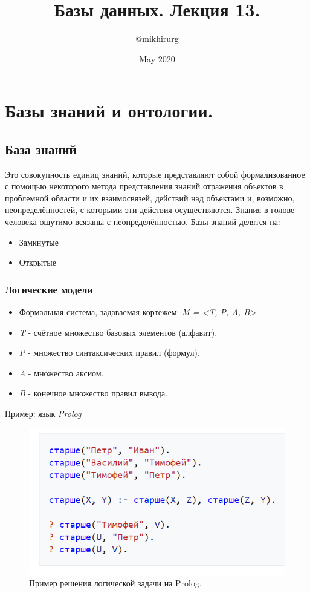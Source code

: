 \documentclass{article}
\title{Базы данных. Лекция 13.}
\author{@mikhirurg }
\date{May 2020}
\begin{document}
\maketitle

\section{Базы знаний и онтологии.}

\subsection{База знаний}
Это совокупность единиц знаний, которые представляют собой формализованное с помощью некоторого метода представления знаний отражения объектов в проблемной области и их взаимосвязей, действий над объектами и, возможно, неопределённостей, с которыми эти действия осуществяются. 
\newline Знания в голове человека ощутимо всязаны с неопределённостью. 
\newline
\newline Базы знаний делятся на:
\begin{itemize}
    \item Замкнутые
    \item Открытые
\end{itemize}

\subsubsection{Логические модели}
\begin{itemize}
    \item Формальная система, задаваемая кортежем: \textit{M = <T, P, A, B>}
    \item \textit{T} - счётное множество базовых элементов (алфавит).
    \item \textit{P} - множество синтаксических правил (формул).
    \item \textit{A} - множество аксиом.
    \item \textit{B} - конечное множество правил вывода.
\end{itemize}
Пример: язык \textit{Prolog}
\begin{figure}[H]
    \centering
    \includegraphics[width = .7\linewidth]{img0}
    \caption{Пример решения логической задачи на Prolog.}
\end{figure}
\end{document}
